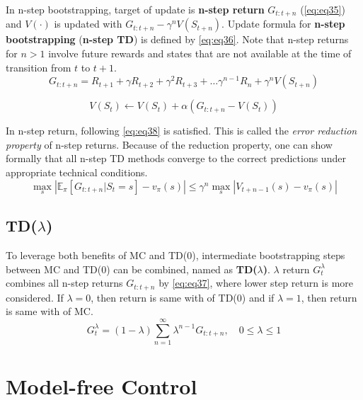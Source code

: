 \documentclass[
	10pt, %
]{article}
\theoremstyle{plain}
\newcommand{\mbb}[1]{\mathbb{#1}}
\newcommand{\tb}[1]{\textbf{#1}}
\newcommand{\ti}[1]{\textit{#1}}
\numberwithin{equation}{subsection} %
\begin{document}
In n-step bootstrapping, target of update is \tb{n-step return} $G_{t:t+n}$ (\cref{eq:eq35}) and $V(\cdot)$ is updated with $G_{t:t+n} - \gamma^n V(S_{t+n})$. Update formula for \tb{n-step bootstrapping} (\tb{n-step TD}) is defined by \cref{eq:eq36}. Note that n-step returns for $n > 1$ involve future rewards and states that are not available at the time of transition from $t$ to $t+1$.
\begin{equation} \label{eq:eq35}
    G_{t:t+n} = R_{t+1} + \gamma R_{t+2} + \gamma^2 R_{t+3} + \dots \gamma^{n-1} R_{n} + \gamma^n V(S_{t+n})
\end{equation}

\begin{equation} \label{eq:eq36}
    V(S_t) \gets V(S_t) + \alpha\left(G_{t:t+n} - V(S_t)\right)
\end{equation}

In n-step return, following \cref{eq:eq38} is satisfied. This is called the \ti{error reduction property} of n-step returns. Because of the reduction property, one can show formally that all n-step TD methods converge to the correct predictions under appropriate technical conditions.
\begin{equation} \label{eq:eq38}
    \max_s\left|\mbb{E}_\pi [G_{t:t+n}|S_t=s]-v_\pi(s)\right| \leq \gamma^n \max_s\left|V_{t+n-1}(s) - v_\pi(s)\right|
\end{equation}


\subsection{TD($\lambda$)}
To leverage both benefits of MC and TD(0), intermediate bootstrapping steps between MC and TD(0) can be combined, named as \tb{TD($\lambda$)}. $\lambda$ return $G^\lambda_t$ combines all n-step returns $G_{t:t+n}$ by \cref{eq:eq37}, where lower step return is more considered. If $\lambda = 0$, then return is same with of TD(0) and if $\lambda = 1$, then return is same with of MC.
\begin{equation} \label{eq:eq37}
    G^\lambda_t = (1-\lambda) \sum_{n=1}^\infty \lambda^{n-1}G_{t:t+n}, \quad 0 \leq \lambda \leq 1
\end{equation}


\section{Model-free Control} \label{sec:model-free control}
\end{document}
